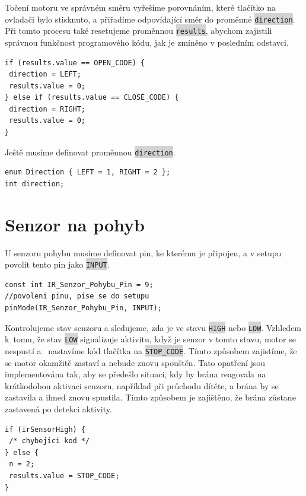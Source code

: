 \documentclass[12pt, a4paper, twoside]{report}
\newcommand{\code}[1]{\colorbox{lightgray}{\texttt{#1}}}
\begin{document}
	\newpage
	
	\noindent Točení motoru ve správném směru vyřešíme porovnáním, které tlačítko na ovladači bylo stisknuto, a přiřadíme odpovídající směr do proměnné \code{direction}. Při tomto procesu také resetujeme proměnnou \code{results}, abychom zajistili správnou funkčnost programového kódu, jak je zmíněno v posledním odstavci. \\
	

	
\begin{lstlisting}[style=c++]
if (results.value == OPEN_CODE) {
 direction = LEFT;
 results.value = 0;
} else if (results.value == CLOSE_CODE) {
 direction = RIGHT;
 results.value = 0;
}
\end{lstlisting}

	\noindent Ještě musíme definovat proměnnou \code{direction}. \\
	
\begin{lstlisting}[style=c++]
enum Direction { LEFT = 1, RIGHT = 2 };
int direction;
\end{lstlisting}	
	
	\section{Senzor na pohyb}
	
	\noindent U senzoru pohybu musíme definovat pin, ke kterému je připojen, a v setupu povolit tento pin jako \code{INPUT}. \\
	
\begin{lstlisting}[style=c++]
const int IR_Senzor_Pohybu_Pin = 9;
//povoleni pinu, pise se do setupu
pinMode(IR_Senzor_Pohybu_Pin, INPUT);
\end{lstlisting}

	\noindent Kontrolujeme stav senzoru a sledujeme, zda je ve stavu \code{HIGH} nebo \code{LOW}. Vzhledem k~tomu, že stav \code{LOW} signalizuje aktivitu, když je senzor v tomto stavu, motor se nespustí a~ nastavíme kód tlačítka na \code{STOP\_CODE}. Tímto způsobem zajistíme, že se motor okamžitě zastaví a nebude znovu spouštěn. Tato opatření jsou implementována tak, aby se předešlo situaci, kdy by brána reagovala na krátkodobou aktivaci senzoru, například při průchodu dítěte, a brána by se zastavila a ihned znovu spustila. Tímto způsobem je zajištěno, že brána zůstane zastavená po detekci aktivity. \\

\begin{lstlisting}[style=c++]
if (irSensorHigh) {
 /* chybejici kod */
} else {
 n = 2;
 results.value = STOP_CODE;
}
\end{lstlisting}
	
\end{document}
